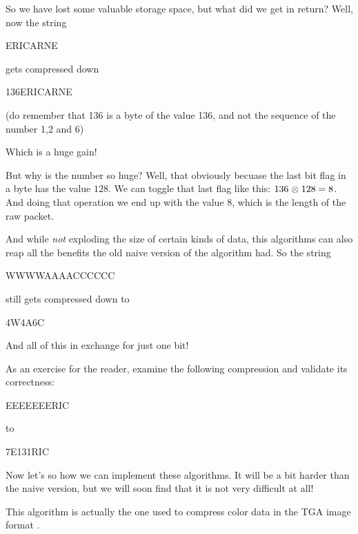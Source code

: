 \begin{refsection}
So we have lost some valuable storage space, but what did we get in
return? Well, now the string

\begin{indentpar}
  ERICARNE
\end{indentpar}

gets compressed down

\begin{indentpar}
  136ERICARNE
\end{indentpar}

(do remember that 136 is a byte of the value 136, and not the sequence
of the number 1,2 and 6)

Which is a huge gain!

But why is the number so huge? Well, that obviously becuase the last
bit flag in a byte has the value $128$. We can toggle that last flag
like this: $136 \mathrel{\otimes} 128 = 8$. And doing that operation we end up with
the value $8$, which is the length of the raw packet.


And while \textit{not} exploding the size of certain kinds of data,
this algorithms can also reap all the benefits the old naive version
of the algorithm had. So the string

\begin{indentpar}
  WWWWAAAACCCCCC
\end{indentpar}

still gets compressed down to

\begin{indentpar}
  4W4A6C
\end{indentpar}

And all of this in exchange for just one bit!

As an exercise for the reader, examine the following compression and
validate its correctness:

\begin{indentpar}
  EEEEEEERIC
\end{indentpar}

to

\begin{indentpar}
  7E131RIC
\end{indentpar}

Now let's so how we can implement these algorithms. It will be a bit
harder than the naive version, but we will soon find that it is not very
difficult at all!

This algorithm is actually the one used to compress color data in the
TGA image format \cite{91:_truev_tga_file_format_specif}.


\end{refsection}
